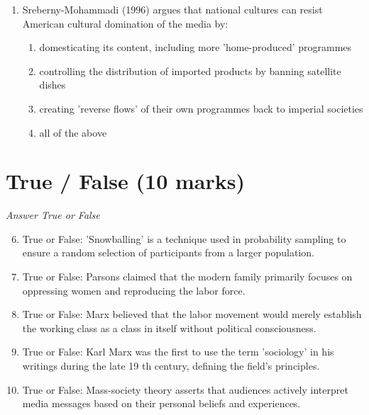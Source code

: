 \documentclass[12pt]{article}
\begin{document}
\begin{enumerate}[label=\arabic*.]
\begin{enumerate}[label=(\alph*)]
    \item the state's power can be exercised through several different administrative structures
    \item the ruling elite is composed of people from various class backgrounds
    \item political parties must compete for the votes of 'consumers' in the electorate
    \item there is a close alignment between class background and party preference
\end{enumerate}
\item Sreberny-Mohammadi (1996) argues that national cultures can resist American cultural domination of the media by:
\begin{enumerate}[label=(\alph*)]
    \item domesticating its content, including more 'home-produced' programmes
    \item controlling the distribution of imported products by banning satellite dishes
    \item creating 'reverse flows' of their own programmes back to imperial societies
    \item all of the above
\end{enumerate}
\end{enumerate}

\section*{True / False (10 marks)}
\textit{Answer True or False}
\begin{enumerate}[label=\arabic*.]
\setcounter{enumi}{5}
\item True or False: 'Snowballing' is a technique used in probability sampling to ensure a random selection of participants from a larger population.
\item True or False: Parsons claimed that the modern family primarily focuses on oppressing women and reproducing the labor force.
\item True or False: Marx believed that the labor movement would merely establish the working class as a class in itself without political consciousness.
\item True or False: Karl Marx was the first to use the term 'sociology' in his writings during the late 19 th century, defining the field's principles.
\item True or False: Mass-society theory asserts that audiences actively interpret media messages based on their personal beliefs and experiences.
\end{enumerate}
\end{document}
